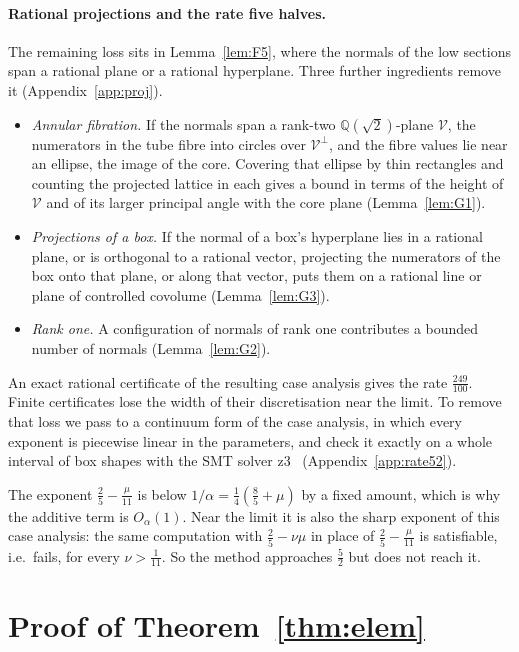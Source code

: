\documentclass[aps,prx,twocolumn,superscriptaddress,nofootinbib,longbibliography]{revtex4-2}
\theoremstyle{plain}
\theoremstyle{definition}
\theoremstyle{remark}
\newcommand{\Q}{\mathbb{Q}}
\begin{document}
\paragraph{Rational projections and the rate five halves.} The remaining loss sits in Lemma~\ref{lem:F5}, where the normals of the low sections span a rational plane or a rational hyperplane. Three further ingredients remove it (Appendix~\ref{app:proj}).
\begin{itemize}
\item \emph{Annular fibration.} If the normals span a rank-two $\Q(\sqrt2)$-plane $\mathcal V$, the numerators in the tube fibre into circles over $\mathcal V^\perp$, and the fibre values lie near an ellipse, the image of the core. Covering that ellipse by thin rectangles and counting the projected lattice in each gives a bound in terms of the height of $\mathcal V$ and of its larger principal angle with the core plane (Lemma~\ref{lem:G1}).
\item \emph{Projections of a box.} If the normal of a box's hyperplane lies in a rational plane, or is orthogonal to a rational vector, projecting the numerators of the box onto that plane, or along that vector, puts them on a rational line or plane of controlled covolume (Lemma~\ref{lem:G3}).
\item \emph{Rank one.} A configuration of normals of rank one contributes a bounded number of normals (Lemma~\ref{lem:G2}).
\end{itemize}
An exact rational certificate of the resulting case analysis gives the rate $\tfrac{249}{100}$. Finite certificates lose the width of their discretisation near the limit. To remove that loss we pass to a continuum form of the case analysis, in which every exponent is piecewise linear in the parameters, and check it exactly on a whole interval of box shapes with the SMT solver z3~\cite{Z3} (Appendix~\ref{app:rate52}).

The exponent $\tfrac25-\tfrac\mu{11}$ is below $1/\alpha=\tfrac14(\tfrac85+\mu)$ by a fixed amount, which is why the additive term is $O_\alpha(1)$. Near the limit it is also the sharp exponent of this case analysis: the same computation with $\tfrac25-\nu\mu$ in place of $\tfrac25-\tfrac\mu{11}$ is satisfiable, i.e.\ fails, for every $\nu>\tfrac1{11}$. So the method approaches $\tfrac52$ but does not reach it.

\section{Proof of Theorem~\ref{thm:elem}}\label{app:elem}
\end{document}
